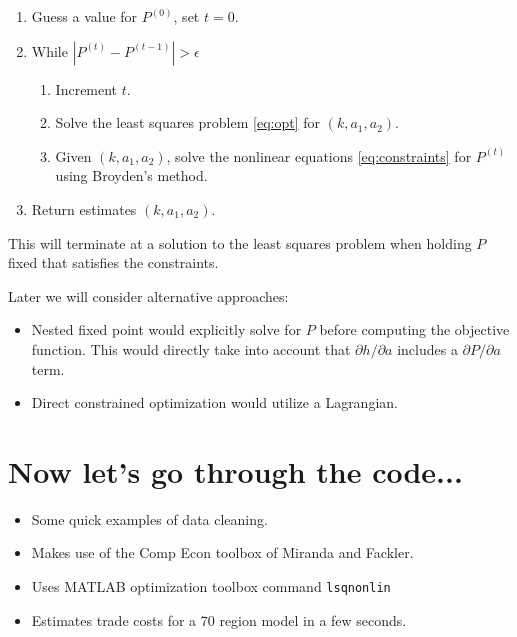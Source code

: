 \documentclass[twoside]{article}
\begin{document}
\begin{enumerate}

\item Guess a value for $P^{(0)}$, set $t = 0$.
\item While $| P^{(t)} - P^{(t-1)}| > \epsilon $ 
\begin{enumerate} 
   \item Increment $t$. 
   \item Solve the least squares problem \eqref{eq:opt} for $(k, a_1, a_2)$. 
   \item Given $(k, a_1, a_2)$, solve the nonlinear equations \eqref{eq:constraints} for $P^{(t)}$ using Broyden's method.  
\end{enumerate}
\item Return estimates $(k, a_1, a_2)$.
\end{enumerate}

This will terminate at a solution to the least squares problem when holding $P$ fixed that satisfies the constraints. 

Later we will consider alternative approaches: 
\begin{itemize}
\item Nested fixed point would explicitly solve for $P$ before computing the objective function. This would directly take into account that $\partial h / \partial a$ includes a $\partial P / \partial a$ term. 
\item Direct constrained optimization would utilize a Lagrangian. 
\end{itemize}

\section{Now let's go through the code...}
 \begin{itemize}
 \item Some quick examples of data cleaning. 
 \item Makes use of the Comp Econ toolbox of Miranda and Fackler. 
 \item Uses MATLAB optimization toolbox command { \tt lsqnonlin }
 \item Estimates trade costs for a 70 region model in a few seconds. 
 \end{itemize}
 
\end{document}

